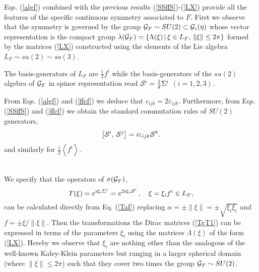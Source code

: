 \documentclass[a4paper,12pt]{article}
\begin{document}
Eqs. (\ref{algf}) combined with the previous results (\ref{SSffS})-(\ref{LX}) 
provide all the features of the specific continuous symmetry associated to 
$F$. First we observe that the symmetry is governed by the group 
${\cal G}_F\sim SU(2)\subset {\cal G}_c(\eta)$ whose vector representation is 
the compact group $\lambda({\cal G}_F)=
\{\Lambda(\xi)\,|\,\xi\in L_F,\, \|\xi\|\le 2\pi\}$ formed by the 
matrices (\ref{LX}) constructed using the elements of the Lie algebra 
$L_F\sim su(2)\sim so(3)$.
\begin{cor}
The basis-generators of $L_F$ are $\frac{i}{2} f^i$ while the basis-generators 
of the $su(2)$ algebra of ${\cal G}_F$ in spinor representation read 
${\cal S}^i=\frac{1}{2}\Sigma^i$ $(i=1,2,3)$. 
\end{cor}
\begin{demo}
From Eqs. (\ref{algf}) and (\ref{ffcf}) we deduce that 
$c_{ijk}=2\varepsilon_{ijk}$. 
Furthermore, from  Eqs. (\ref{SSffS}) and (\ref{ffcf})  
we obtain the standard commutation rules of $SU(2)$ generators, 
\begin{equation}
\left[ {\cal S}^i,\,{\cal S}^j \right]=i\varepsilon_{ijk}{\cal S}^k.
\end{equation}  
and similarly for  $\frac{i}{2}\left<f^i\right>$.
\end{demo}\\
We specify that the operators of $\sigma({\cal G}_F)$, 
\begin{equation}\label{TxiS}
T(\xi)=e^{i\xi_i \Sigma^i} =e^{2i\xi_i {\cal S}^i}\,, 
\quad \xi=\xi_i f^i\in L_F, 
\end{equation}
can be calculated directly from Eq. (\ref{Taf}) replacing 
$\alpha=\pm\|\xi\|=\pm\sqrt{\xi_i\xi_i}$ 
and $f=\pm \xi/ \|\xi\|$. Then the transformations the Dirac
matrices (\ref{TgT1}) can be expressed in terms of the parameters $\xi_i$ 
using the matrices $\Lambda(\xi)$ of the form (\ref{LX}). Hereby we 
observe that $\xi_i$ are nothing other than the analogous of the well-known 
Kaley-Klein parameters but ranging in a larger spherical domain (where 
$\|\xi\|\le 2\pi$) such that they cover two times the group 
${\cal G}_F\sim SU(2)$.  
\end{document}
